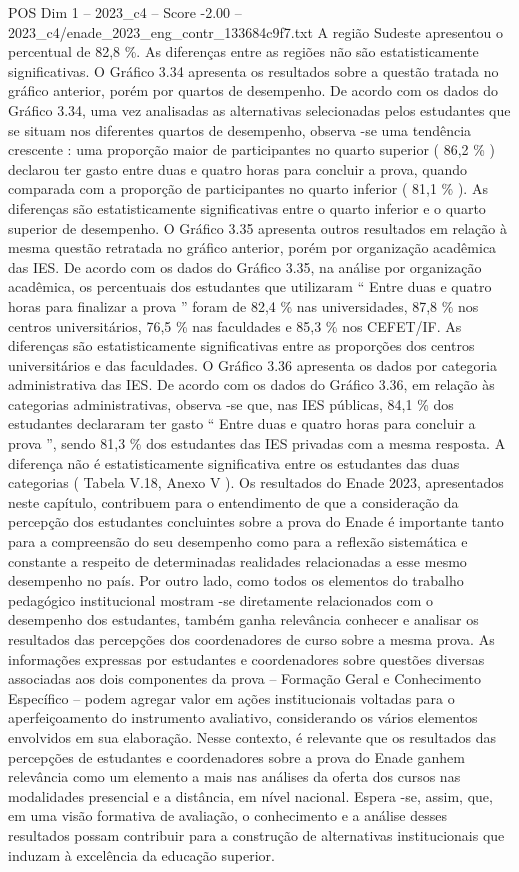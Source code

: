 \begin{textsample}{POS Dim 1 – 2023\_c4 – Score -2.00 – 2023\_c4/enade\_2023\_eng\_contr\_133684c9f7.txt}
A região Sudeste apresentou o percentual de 82,8 \%.
As diferenças entre as regiões não são estatisticamente significativas.
O Gráfico 3.34 apresenta os resultados sobre a questão tratada no gráfico anterior, porém por quartos de desempenho.
De acordo com os dados do Gráfico 3.34, uma vez analisadas as alternativas selecionadas pelos estudantes que se situam nos diferentes quartos de desempenho, observa -se uma tendência crescente : uma proporção maior de participantes no quarto superior ( 86,2 \% ) declarou ter gasto entre duas e quatro horas para concluir a prova, quando comparada com a proporção de participantes no quarto inferior ( 81,1 \% ).
As diferenças são estatisticamente significativas entre o quarto inferior e o quarto superior de desempenho.
O Gráfico 3.35 apresenta outros resultados em relação à mesma questão retratada no gráfico anterior, porém por organização acadêmica das IES.
De acordo com os dados do Gráfico 3.35, na análise por organização acadêmica, os percentuais dos estudantes que utilizaram “ Entre duas e quatro horas para finalizar a prova ” foram de 82,4 \% nas universidades, 87,8 \% nos centros universitários, 76,5 \% nas faculdades e 85,3 \% nos CEFET/IF.
As diferenças são estatisticamente significativas entre as proporções dos centros universitários e das faculdades.
O Gráfico 3.36 apresenta os dados por categoria administrativa das IES.
De acordo com os dados do Gráfico 3.36, em relação às categorias administrativas, observa -se que, nas IES públicas, 84,1 \% dos estudantes declararam ter gasto “ Entre duas e quatro horas para concluir a prova ”, sendo 81,3 \% dos estudantes das IES privadas com a mesma resposta.
A diferença não é estatisticamente significativa entre os estudantes das duas categorias ( Tabela V.18, Anexo V ).
Os resultados do Enade 2023, apresentados neste capítulo, contribuem para o entendimento de que a consideração da percepção dos estudantes concluintes sobre a prova do Enade é importante tanto para a compreensão do seu desempenho como para a reflexão sistemática e constante a respeito de determinadas realidades relacionadas a esse mesmo desempenho no país.
Por outro lado, como todos os elementos do trabalho pedagógico institucional mostram -se diretamente relacionados com o desempenho dos estudantes, também ganha relevância conhecer e analisar os resultados das percepções dos coordenadores de curso sobre a mesma prova.
As informações expressas por estudantes e coordenadores sobre questões diversas associadas aos dois componentes da prova – Formação Geral e Conhecimento Específico – podem agregar valor em ações institucionais voltadas para o aperfeiçoamento do instrumento avaliativo, considerando os vários elementos envolvidos em sua elaboração.
Nesse contexto, é relevante que os resultados das percepções de estudantes e coordenadores sobre a prova do Enade ganhem relevância como um elemento a mais nas análises da oferta dos cursos nas modalidades presencial e a distância, em nível nacional.
Espera -se, assim, que, em uma visão formativa de avaliação, o conhecimento e a análise desses resultados possam contribuir para a construção de alternativas institucionais que induzam à excelência da educação superior.

\end{textsample}
